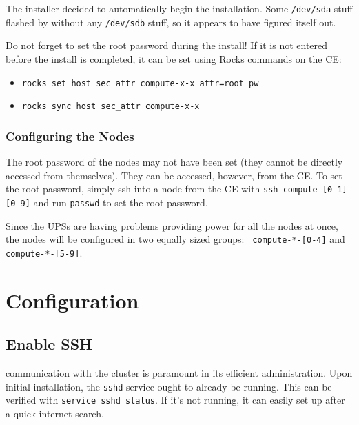\documentclass[12pt]{article}
\begin{document}
\qq The installer decided to automatically begin the installation. Some
{\tt /dev/sda} stuff flashed by without any {\tt /dev/sdb} stuff, so it appears
to have figured itself out.

\begin{tcolorbox}[title=NOTE, colback=white, colframe=blue]
  Do not forget to set the root password during the
  install! If it is not entered before the install is completed, it can be set
  using Rocks commands on the CE:
  \begin{itemize}
  \item {\tt rocks set host sec\_attr compute-x-x attr=root\_pw}
  \item {\tt rocks sync host sec\_attr compute-x-x}
  \end{itemize}
\end{tcolorbox}

\subsubsection{Configuring the Nodes}

\begin{tcolorbox}[title=NOTE, colback=white, colframe=blue]
  The root password of the nodes may not have been set (they cannot be
  directly accessed from themselves). They can be accessed, however, from the
  CE. To set the root password, simply ssh into a node from the CE with {\tt ssh
    compute-[0-1]-[0-9]} and run {\tt passwd} to set the root password.
\end{tcolorbox}

\qq Since the UPSs are having problems providing power for all the nodes at
once, the nodes will be configured in two equally sized groups: {\tt
  compute-*-[0-4]} and {\tt compute-*-[5-9]}.



\section{Configuration}

\subsection{Enable SSH}

 communication with the cluster is paramount in its efficient
administration. Upon initial installation, the {\tt sshd} service ought to
already be running. This can be verified with {\tt service sshd status}. If it's
not running, it can easily set up after a quick internet search.
\end{document}
